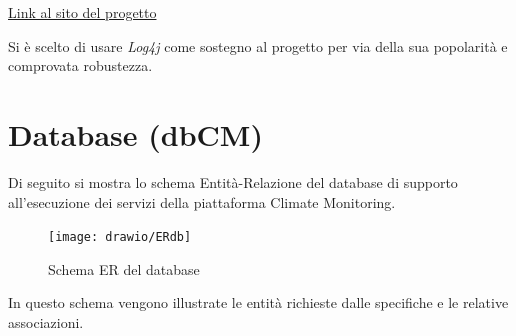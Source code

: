 \href{https://logging.apache.org/log4j/2.x/}{Link al sito del progetto}

Si è scelto di usare \textsl{Log4j} come sostegno al progetto per via della sua popolarità e comprovata robustezza.

\chapter{Database (dbCM)}
Di seguito si mostra lo schema Entità-Relazione del database di supporto all’esecuzione dei servizi della piattaforma Climate Monitoring.

\begin{figure}[h]
	\centering
	\caption{Schema ER del database}
	\label{fig:erdb}
	\texttt{[image: drawio/ERdb]}
\end{figure}

In questo schema vengono illustrate le entità richieste dalle specifiche e le relative associazioni.

